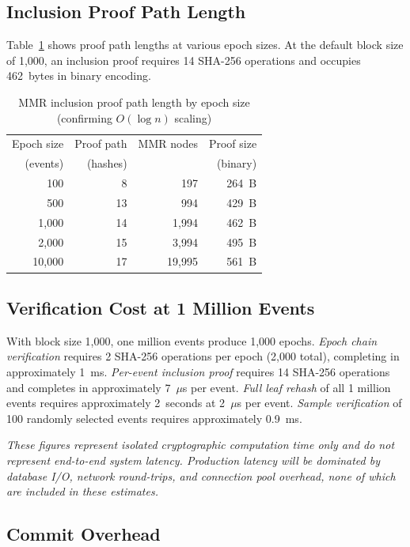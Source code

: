 \documentclass{article}
\begin{document}
\subsection{Inclusion Proof Path Length}

Table~\ref{tab:proof} shows proof path lengths at various epoch sizes. At the
default block size of 1,000, an inclusion proof requires 14 SHA-256 operations
and occupies 462~bytes in binary encoding.

\begin{table}[H]
\centering
\caption{MMR inclusion proof path length by epoch size (confirming $O(\log n)$
  scaling)}
\label{tab:proof}
\begin{tabular}{rrrr}
\toprule
Epoch size & Proof path & MMR nodes & Proof size \\
(events)   & (hashes)   &           & (binary) \\
\midrule
100    &  8 &     197 & 264~B \\
500    & 13 &     994 & 429~B \\
1,000  & 14 &   1,994 & 462~B \\
2,000  & 15 &   3,994 & 495~B \\
10,000 & 17 &  19,995 & 561~B \\
\bottomrule
\end{tabular}
\end{table}

\subsection{Verification Cost at 1 Million Events}

With block size 1,000, one million events produce 1,000 epochs. \textit{Epoch
chain verification} requires 2 SHA-256 operations per epoch (2,000 total),
completing in approximately 1~ms. \textit{Per-event inclusion proof} requires 14
SHA-256 operations and completes in approximately 7~$\mu$s per event.
\textit{Full leaf rehash} of all 1 million events requires approximately
2~seconds at 2~$\mu$s per event. \textit{Sample verification} of 100 randomly
selected events requires approximately 0.9~ms.

\noindent\textit{These figures represent isolated cryptographic computation
time only and do not represent end-to-end system latency. Production latency
will be dominated by database I/O, network round-trips, and connection pool
overhead, none of which are included in these estimates.}

\subsection{Commit Overhead}
\end{document}
